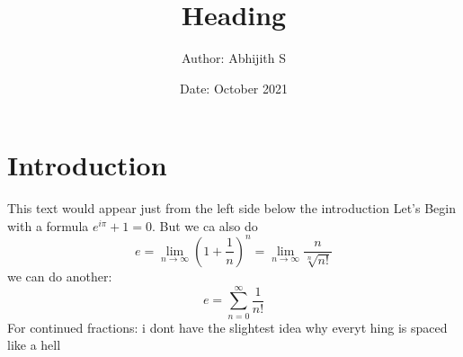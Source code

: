 \documentclass{article}
\title{Heading}
\author{Author: Abhijith S}
\date{Date: October 2021}
\begin{document}

\maketitle

\section{Introduction}

This text would appear just from the left side below the introduction
Let's Begin with a formula $e^{i\pi}+1 = 0$. But we ca also do 
$$e =  \lim_{n\to\infty}\left(1+ \frac{1}{n}\right)^n = \lim_{n\to\infty}\frac{n}{\sqrt[n]{n!}}$$
we can do another: $$e = \sum_{n=0}^{\infty}\frac{1}{n!}$$
For continued fractions:
\newline
i dont have the slightest idea why everyt hing is spaced like a hell
\end{document}
